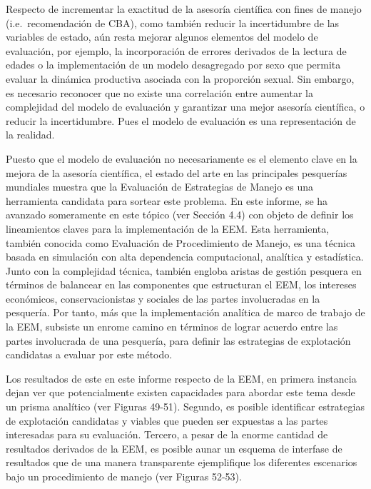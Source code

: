 \documentclass[
  spanish,
]{article}
\begin{document}
Respecto de incrementar la exactitud de la asesoría científica con fines
de manejo (i.e.~recomendación de CBA), como también reducir la
incertidumbre de las variables de estado, aún resta mejorar algunos
elementos del modelo de evaluación, por ejemplo, la incorporación de
errores derivados de la lectura de edades o la implementación de un
modelo desagregado por sexo que permita evaluar la dinámica productiva
asociada con la proporción sexual. Sin embargo, es necesario reconocer
que no existe una correlación entre aumentar la complejidad del modelo
de evaluación y garantizar una mejor asesoría científica, o reducir la
incertidumbre. Pues el modelo de evaluación es una representación de la
realidad.

Puesto que el modelo de evaluación no necesariamente es el elemento
clave en la mejora de la asesoría científica, el estado del arte en las
principales pesquerías mundiales muestra que la Evaluación de
Estrategias de Manejo es una herramienta candidata para sortear este
problema. En este informe, se ha avanzado someramente en este tópico
(ver Sección 4.4) con objeto de definir los lineamientos claves para la
implementación de la EEM. Esta herramienta, también conocida como
Evaluación de Procedimiento de Manejo, es una técnica basada en
simulación con alta dependencia computacional, analítica y estadística.
Junto con la complejidad técnica, también engloba aristas de gestión
pesquera en términos de balancear en las componentes que estructuran el
EEM, los intereses económicos, conservacionistas y sociales de las
partes involucradas en la pesquería. Por tanto, más que la
implementación analítica de marco de trabajo de la EEM, subsiste un
enrome camino en términos de lograr acuerdo entre las partes involucrada
de una pesquería, para definir las estrategias de explotación candidatas
a evaluar por este método.

Los resultados de este en este informe respecto de la EEM, en primera
instancia dejan ver que potencialmente existen capacidades para abordar
este tema desde un prisma analítico (ver Figuras 49-51). Segundo, es
posible identificar estrategias de explotación candidatas y viables que
pueden ser expuestas a las partes interesadas para su evaluación.
Tercero, a pesar de la enorme cantidad de resultados derivados de la
EEM, es posible aunar un esquema de interfase de resultados que de una
manera transparente ejemplifique los diferentes escenarios bajo un
procedimiento de manejo (ver Figuras 52-53).
\end{document}

